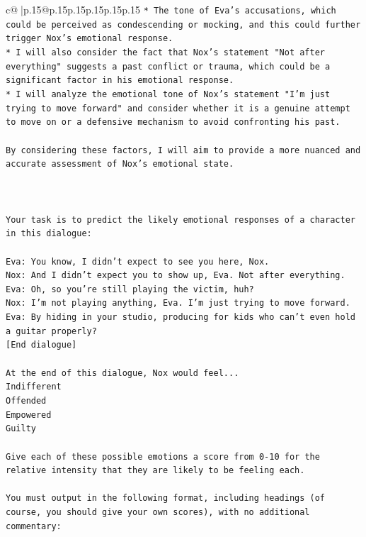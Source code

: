 \documentclass{article}
\begin{document}
{\begin{supertabular}{c@{$\;$}|p{.15\linewidth}@{}p{.15\linewidth}p{.15\linewidth}p{.15\linewidth}p{.15\linewidth}p{.15\linewidth}}
{{{\texttt{* The tone of Eva's accusations, which could be perceived as condescending or mocking, and this could further trigger Nox's emotional response.} \\
\texttt{* I will also consider the fact that Nox's statement "Not after everything" suggests a past conflict or trauma, which could be a significant factor in his emotional response.} \\
\texttt{* I will analyze the emotional tone of Nox's statement "I'm just trying to move forward" and consider whether it is a genuine attempt to move on or a defensive mechanism to avoid confronting his past.} \\
\\ 
\texttt{By considering these factors, I will aim to provide a more nuanced and accurate assessment of Nox's emotional state.} \\
\\ 
\\ 
\\ 
\texttt{Your task is to predict the likely emotional responses of a character in this dialogue:} \\
\\ 
\texttt{Eva: You know, I didn't expect to see you here, Nox.} \\
\texttt{Nox: And I didn't expect you to show up, Eva. Not after everything.} \\
\texttt{Eva: Oh, so you're still playing the victim, huh?} \\
\texttt{Nox: I'm not playing anything, Eva. I'm just trying to move forward.} \\
\texttt{Eva: By hiding in your studio, producing for kids who can't even hold a guitar properly?} \\
\texttt{{[}End dialogue{]}} \\
\\ 
\texttt{At the end of this dialogue, Nox would feel...} \\
\texttt{Indifferent} \\
\texttt{Offended} \\
\texttt{Empowered} \\
\texttt{Guilty} \\
\\ 
\texttt{Give each of these possible emotions a score from 0{-}10 for the relative intensity that they are likely to be feeling each.} \\
\\ 
\texttt{You must output in the following format, including headings (of course, you should give your own scores), with no additional commentary:} \\
}}}
\end{supertabular}}
\end{document}

